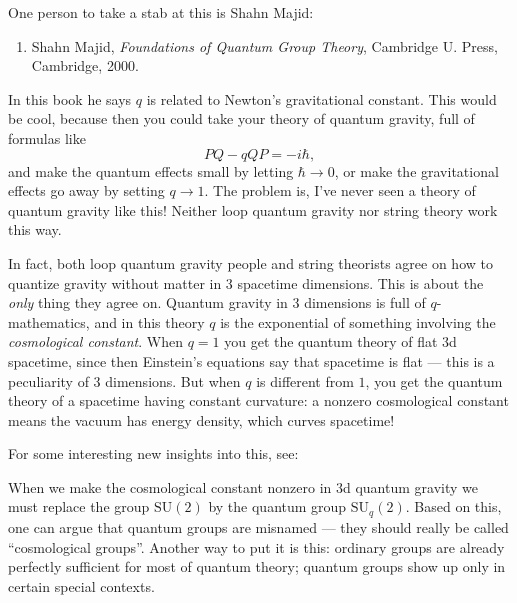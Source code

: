 \documentclass{article}
\def\tightlist{}
\renewcommand{\texttt}[1]{%
  \begingroup
  \ttfamily
  \begingroup\lccode`~=`/\lowercase{\endgroup\def~}{/\discretionary{}{}{}}%
  \begingroup\lccode`~=`[\lowercase{\endgroup\def~}{[\discretionary{}{}{}}%
  \begingroup\lccode`~=`.\lowercase{\endgroup\def~}{.\discretionary{}{}{}}%
  \catcode`/=\active\catcode`[=\active\catcode`.=\active
  \scantokens{#1\noexpand}%
  \endgroup
}
\begin{document}
One person to take a stab at this is Shahn Majid:

\begin{enumerate}
\def\labelenumi{\arabic{enumi})}
\setcounter{enumi}{2}
\tightlist
\item
  Shahn Majid, \emph{Foundations of Quantum Group Theory}, Cambridge U.
  Press, Cambridge, 2000.
\end{enumerate}

In this book he says \(q\) is related to Newton's gravitational
constant. This would be cool, because then you could take your theory of
quantum gravity, full of formulas like \[PQ - qQP = -i \hbar,\] and make
the quantum effects small by letting \(\hbar \to 0\), or make the
gravitational effects go away by setting \(q \to 1\). The problem is,
I've never seen a theory of quantum gravity like this! Neither loop
quantum gravity nor string theory work this way.

In fact, both loop quantum gravity people and string theorists agree on
how to quantize gravity without matter in 3 spacetime dimensions. This
is about the \emph{only} thing they agree on. Quantum gravity in 3
dimensions is full of \(q\)-mathematics, and in this theory \(q\) is the
exponential of something involving the \emph{cosmological constant}.
When \(q = 1\) you get the quantum theory of flat 3d spacetime, since
then Einstein's equations say that spacetime is flat --- this is a
peculiarity of 3 dimensions. But when \(q\) is different from \(1\), you
get the quantum theory of a spacetime having constant curvature: a
nonzero cosmological constant means the vacuum has energy density, which
curves spacetime!

For some interesting new insights into this, see:


When we make the cosmological constant nonzero in 3d quantum gravity we
must replace the group \(\mathrm{SU}(2)\) by the quantum group
\(\mathrm{SU}_q(2)\). Based on this, one can argue that quantum groups
are misnamed --- they should really be called ``cosmological groups''.
Another way to put it is this: ordinary groups are already perfectly
sufficient for most of quantum theory; quantum groups show up only in
certain special contexts.
\end{document}
